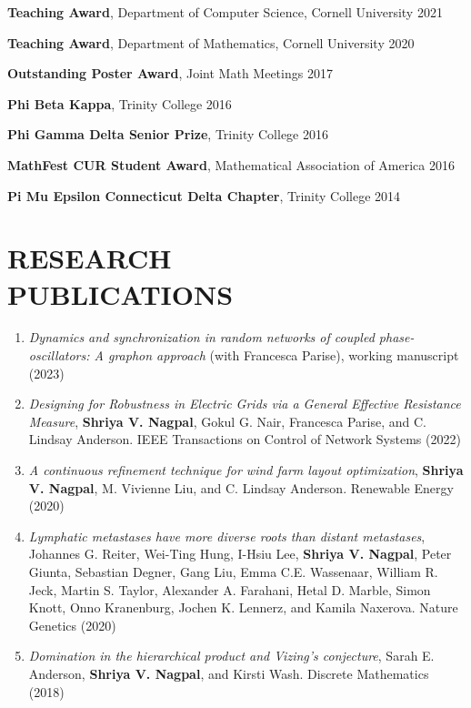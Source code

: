 \documentclass{res} %
\begin{document}
\begin{resume}
{\bf Teaching Award}, Department of Computer Science, Cornell University \hfill2021

{\bf Teaching Award}, Department of Mathematics, Cornell University \hfill2020

{\bf Outstanding Poster Award}, Joint Math Meetings \hfill2017

{\bf Phi Beta Kappa}, Trinity College \hfill2016

{\bf Phi Gamma Delta Senior Prize}, Trinity College \hfill2016

{\bf MathFest CUR Student Award}, Mathematical Association of America \hfill2016

{\bf Pi Mu Epsilon Connecticut Delta Chapter}, Trinity College \hfill2014


\section{RESEARCH\\PUBLICATIONS}
\begin{enumerate}
    \item {\sl Dynamics and synchronization in random networks of coupled phase-oscillators: A graphon approach} (with Francesca Parise), working manuscript (2023)
	
    \item {\sl Designing for Robustness in Electric Grids via a General Effective Resistance Measure}, \textbf{Shriya V. Nagpal}, Gokul G. Nair, Francesca Parise, and C. Lindsay Anderson. IEEE Transactions on Control of Network Systems (2022)
	 	
    \item {\sl A continuous refinement technique for wind farm layout optimization}, \textbf{Shriya V. Nagpal}, M. Vivienne Liu, and C. Lindsay Anderson. Renewable Energy (2020)

    \item {\sl Lymphatic metastases have more diverse roots than distant metastases}, Johannes G. Reiter, Wei-Ting Hung, I-Hsiu Lee, \textbf{Shriya V. Nagpal}, Peter Giunta, Sebastian Degner, Gang Liu, Emma C.E. Wassenaar, William R. Jeck, Martin S. Taylor, Alexander A. Farahani, Hetal D. Marble, Simon Knott, Onno Kranenburg, Jochen K. Lennerz, and Kamila Naxerova. Nature Genetics (2020)

    \item {\sl Domination in the hierarchical product and Vizing’s conjecture}, Sarah E. Anderson, \textbf{Shriya V. Nagpal}, and Kirsti Wash. Discrete Mathematics (2018)
\end{enumerate}


\end{resume}
\end{document}
